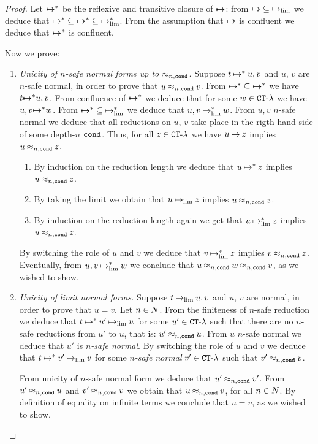 \begin{proof}
Let ${ \mapsto \mspace{-17mu} \mapsto }^*$ be the reflexive and transitive closure of ${ \mapsto \mspace{-17mu} \mapsto }$:
from ${ \mapsto \mspace{-17mu} \mapsto } \subseteq \mathbin{\mapsto}_{\lim}$ we deduce that
$\mathbin{\mapsto}^* \subseteq { \mapsto \mspace{-17mu} \mapsto }^* \subseteq \mathbin{\mapsto}_{\lim}^*$.
From the assumption that ${ \mapsto \mspace{-17mu} \mapsto }$ is confluent we deduce that
${ \mapsto \mspace{-17mu} \mapsto }^*$ is confluent. 

Now we prove:

\begin{enumerate}

\item
\emph{Unicity of $n$-safe normal forms up to $\mathbin{\approx_{n,{\tt cond}}}$.}
Suppose  $t \mathbin{\mapsto}^* u,v$ and $u$, $v$ are $n$-safe normal, 
in order to prove that $u\mathbin{\approx_{n,{\tt cond}}}  v$.
From $\mathbin{\mapsto}^* \subseteq { \mapsto \mspace{-17mu} \mapsto }^*$ we have 
$t { \mapsto \mspace{-17mu} \mapsto }^* u,v$. From confluence of ${ \mapsto \mspace{-17mu} \mapsto }^*$
we deduce that for some $w \in { {\tt CT}\mbox{-}\lambda}$ we have $u,v { \mapsto \mspace{-17mu} \mapsto }^* w$. 
From ${ \mapsto \mspace{-17mu} \mapsto }^* \subseteq \mathbin{\mapsto}_{\lim}^*$
we deduce that $u,v \mathbin{\mapsto}_{\lim}^* w$. From $u,v$ $n$-safe normal we deduce that
all reductions on $u$, $v$ take place in the rigth-hand-side of some depth-$n$ ${\tt cond}$.
Thus, for all $z \in { {\tt CT}\mbox{-}\lambda}$ we have
 $u \mathbin{\mapsto} z$ implies $u\mathbin{\approx_{n,{\tt cond}}} z$. 
\begin{enumerate} 
\item
By induction on the reduction
length we deduce that $u \mathbin{\mapsto}^* z$ implies $u\mathbin{\approx_{n,{\tt cond}}} z$. 
\item
By taking the limit
we obtain that $u \mathbin{\mapsto}_{\lim} z$ implies $u\mathbin{\approx_{n,{\tt cond}}} z$. 
\item
By induction on the reduction length again we get  that $u \mathbin{\mapsto}_{\lim}^* z$ implies $u\mathbin{\approx_{n,{\tt cond}}} z$.
\end{enumerate}
By switching the role of $u$ and $v$ we deduce that $v \mathbin{\mapsto}_{\lim}^* z$ implies $v \mathbin{\approx_{n,{\tt cond}}} z$.
Eventually, from $u,v \mathbin{\mapsto}_{\lim}^* w$ we conclude that $u\mathbin{\approx_{n,{\tt cond}}} w \mathbin{\approx_{n,{\tt cond}}} v$,
as we wished to show.

\item
\emph{Unicity of limit normal forms.}
Suppose  $t \mathbin{\mapsto}_{\lim} u,v$ and $u$, $v$ are normal, in order to prove that $u=v$.
Let $n \in {N}$.
From the finiteness of $n$-safe reduction we deduce that $t \mathbin{\mapsto}^* u' \mathbin{\mapsto}_{\lim} u$
for some $u' \in { {\tt CT}\mbox{-}\lambda}$ such that there are no $n$-safe reductions from
$u'$ to $u$, that is: $u' \mathbin{\approx_{n,{\tt cond}}} u$. 
From $u$ $n$-safe normal we deduce that $u'$ is \emph{$n$-safe normal}.
By switching the role of $u$ and $v$ we deduce that 
$t \mathbin{\mapsto}^* v' \mathbin{\mapsto}_{\lim} v$ for some \emph{$n$-safe normal} $v' \in { {\tt CT}\mbox{-}\lambda}$ 
such that $v'\mathbin{\approx_{n,{\tt cond}}} v$.

From unicity of $n$-safe normal form we deduce that $u'\mathbin{\approx_{n,{\tt cond}}} v'$.
From $u' \mathbin{\approx_{n,{\tt cond}}} u$ and $v' \mathbin{\approx_{n,{\tt cond}}} v$ we obtain that $u \mathbin{\approx_{n,{\tt cond}}} v $, for all $n \in {N}$.
By definition of equality on infinite terms we conclude that $u=v$, as we wished to show.
\end{enumerate}
\end{proof}

